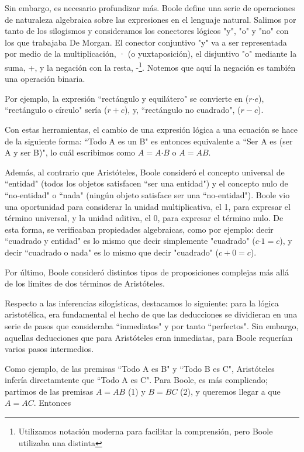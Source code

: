 \documentclass{article}
\begin{document}
Sin embargo, es necesario profundizar más. Boole define una serie de operaciones de naturaleza algebraica sobre las expresiones en el lenguaje natural. Salimos por tanto de los silogismos y consideramos los conectores lógicos "y", "o" y "no" con los que trabajaba De Morgan. El conector conjuntivo "y" va a ser representada por medio de la multiplicación, · (o yuxtaposición), el disjuntivo "o" mediante la suma, +, y la negación con la resta, -\footnote{Utilizamos notación moderna para facilitar la comprensión, pero Boole utilizaba una distinta}. Notemos que aquí la negación es también una operación binaria.

Por ejemplo, la expresión ``rectángulo y equilátero" se convierte en ($r \text{·} e$), ``rectángulo o círculo" sería ($r + c$), y, ``rectángulo no cuadrado", ($r - c$).

Con estas herramientas, el cambio de una expresión lógica a una ecuación se hace de la siguiente forma: ``Todo A es un B" es entonces equivalente a ``Ser A es (ser A y ser B)", lo cuál escribimos como $A = A \text{·} B$ o $A = AB$.

Además, al contrario que Aristóteles, Boole consideró el concepto universal de ``entidad" (todos los objetos satisfacen ``ser una entidad") y el concepto nulo de ``no-entidad" o ``nada" (ningún objeto satisface ser una ``no-entidad"). Boole vio una oportunidad para considerar la unidad multiplicativa, el 1, para expresar el término universal, y la unidad aditiva, el 0, para expresar el término nulo. De esta forma, se verificaban propiedades algebraicas, como por ejemplo: decir ``cuadrado y entidad" es lo mismo que decir simplemente "cuadrado" ($c \text{·} 1 = c$), y decir ``cuadrado o nada" es lo mismo que decir "cuadrado" ($c + 0 = c$).

Por último, Boole consideró distintos tipos de proposiciones complejas más allá de los límites de dos términos de Aristóteles.

Respecto a las inferencias silogísticas, destacamos lo siguiente: para la lógica aristotélica, era fundamental el hecho de que las deducciones se dividieran en una serie de pasos que consideraba ``inmediatos" y por tanto ``perfectos". Sin embargo, aquellas deducciones que para Aristóteles eran inmediatas, para Boole requerían varios pasos intermedios\cite{boole2003laws}.

Como ejemplo, de las premisas ``Todo A es B" y ``Todo B es C", Aristóteles infería directamtente que ``Todo A es C". Para Boole, es más complicado; partimos de las premisas $A = AB$ (1) y $B = BC$ (2), y queremos llegar a que $A = AC$. Entonces\cite{gasser2000john}
\end{document}
